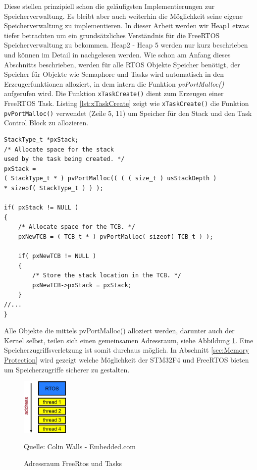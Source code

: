 \documentclass[ngerman]{seminarvorlage}
\newcommand*{\quelle}{%
  \footnotesize Quelle: 
}
\begin{document}
Diese stellen prinzipiell schon die ge\-läu\-figsten Implementierungen zur Speicherverwaltung. Es bleibt aber auch weiterhin die Möglichkeit seine eigene Speicherverwaltung zu implementieren. In dieser Arbeit werden wir Heap1 etwas tiefer betrachten um ein grundsätzliches Verständnis für die FreeRTOS Speicherverwaltung zu bekommen. Heap2 - Heap 5 werden nur kurz beschrieben und können im Detail in \cite{MasteringFreeRtos}\cite{FreeRtosAdvanced} nachgelesen werden.      
Wie schon am Anfang dieses Abschnitts beschrieben, werden für alle RTOS Objekte Speicher benötigt, der Speicher für Objekte wie Semaphore und Tasks wird automatisch in den Erzeugerfunktionen alloziert, in dem intern die Funktion \textit{pvPortMalloc()} aufgerufen wird. Die Funktion \verb|xTaskCreate()| dient zum Erzeugen einer FreeRTOS Task. Listing \ref{lst:xTaskCreate} zeigt wie \verb|xTaskCreate()| die Funktion \verb|pvPortMalloc()| verwendet (Zeile 5, 11) um Speicher für den Stack und den Task Control Block zu allozieren.
\begin{lstlisting}[caption={xTaskCreate() memory allocation. Aus Task.c}, linewidth=8cm,captionpos=b, label=lst:xTaskCreate, float=hbt]
StackType_t *pxStack;
/* Allocate space for the stack 
used by the task being created. */
pxStack = 
( StackType_t * ) pvPortMalloc(( ( ( size_t ) usStackDepth ) 
* sizeof( StackType_t ) ) );

if( pxStack != NULL )
{
	/* Allocate space for the TCB. */
	pxNewTCB = ( TCB_t * ) pvPortMalloc( sizeof( TCB_t ) );

	if( pxNewTCB != NULL )
	{
		/* Store the stack location in the TCB. */
		pxNewTCB->pxStack = pxStack;
	}
//...
}

\end{lstlisting}


Alle Objekte die mittels pvPortMalloc() alloziert werden, darunter auch der Kernel selbst, teilen sich einen gemeinsamen Adressraum, siehe Abbildung \ref{fig:AddressSpace}. Eine Speicherzugriffsverletzung ist somit durchaus möglich. In Abschnitt \ref{sec:Memory Protection} wird gezeigt welche Möglichkeit der STM32F4 und FreeRTOS bieten um Speicherzugriffe sicherer zu gestalten.    
\begin{figure}[htb!]
	\centering
		\includegraphics[width=0.2\textwidth]{Pictures/EmbeddedCom/addressSpace.jpg}
	\caption{Adressraum FreeRtos und Tasks}
	\quelle{Colin Walls - Embedded.com}
	\label{fig:AddressSpace}
\end{figure}    
\end{document}
